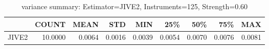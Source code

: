 \begin{table}[ht]
\centering
\caption{variance summary: Estimator=JIVE2, Instruments=125, Strength=0.60}
\begin{tabular}{lrrrrrrrr}
\toprule
 & COUNT & MEAN & STD & MIN & 25\% & 50\% & 75\% & MAX \\
\midrule
JIVE2 & 10.0000 & 0.0064 & 0.0016 & 0.0039 & 0.0054 & 0.0070 & 0.0076 & 0.0081 \\
\bottomrule
\end{tabular}
\end{table}
